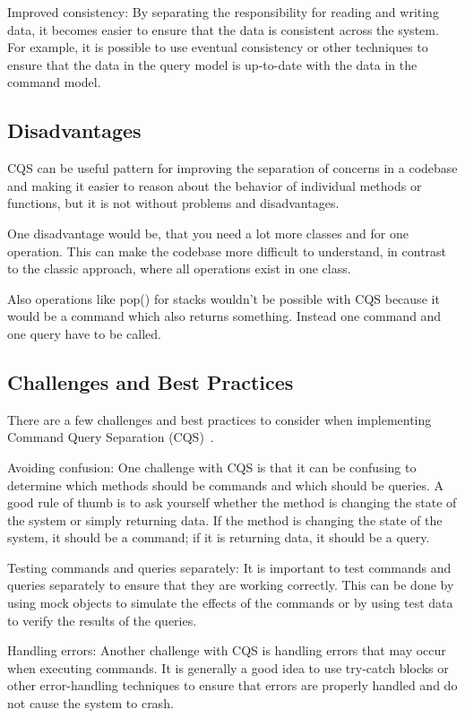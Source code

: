 \documentclass[11pt,conference]{IEEEtran}
\begin{document}
Improved consistency: By separating the responsibility for reading and writing data, it becomes easier to ensure that the data is consistent across the system. For example, it is possible to use eventual consistency or other techniques to ensure that the data in the query model is up-to-date with the data in the command model.

\subsection{Disadvantages}

CQS can be useful pattern for improving the separation of concerns in a codebase and making it easier to reason about the behavior of individual methods or functions, but it is not without problems and disadvantages.

One disadvantage would be, that you need a lot more classes and for one operation.
This can make the codebase more difficult to understand, in contrast to the classic approach, where all operations exist in one class.

Also operations like pop() for stacks wouldn't be possible with CQS because it would be a command which also returns something.
Instead one command and one query have to be called.

\subsection{Challenges and Best Practices}

There are a few challenges and best practices to consider when implementing Command Query Separation (CQS)~\cite{martinfowler-cqs}.

Avoiding confusion: One challenge with CQS is that it can be confusing to determine which methods should be commands and which should be queries. A good rule of thumb is to ask yourself whether the method is changing the state of the system or simply returning data. If the method is changing the state of the system, it should be a command; if it is returning data, it should be a query.

Testing commands and queries separately: It is important to test commands and queries separately to ensure that they are working correctly. This can be done by using mock objects to simulate the effects of the commands or by using test data to verify the results of the queries.

Handling errors: Another challenge with CQS is handling errors that may occur when executing commands. It is generally a good idea to use try-catch blocks or other error-handling techniques to ensure that errors are properly handled and do not cause the system to crash.
\end{document}
